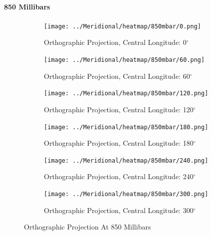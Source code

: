 \documentclass[hidelinks]{article}
\begin{document}
\paragraph{850 Millibars}
\begin{figure}[h!]
	\centering
	\begin{subfigure}[b]{0.45545\linewidth}
		\texttt{[image: ../Meridional/heatmap/850mbar/0.png]}
		\caption{Orthographic Projection, Central Longitude: 0$^\circ$}
	\end{subfigure}
	\begin{subfigure}[b]{0.45545\linewidth}
		\texttt{[image: ../Meridional/heatmap/850mbar/60.png]}
		\caption{Orthographic Projection, Central Longitude: 60$^\circ$}
	\end{subfigure}
	\begin{subfigure}[b]{0.45545\linewidth}
		\texttt{[image: ../Meridional/heatmap/850mbar/120.png]}
		\caption{Orthographic Projection, Central Longitude: 120$^\circ$}
	\end{subfigure}
	\begin{subfigure}[b]{0.45545\linewidth}
		\texttt{[image: ../Meridional/heatmap/850mbar/180.png]}
		\caption{Orthographic Projection, Central Longitude: 180$^\circ$}
	\end{subfigure}
	\begin{subfigure}[b]{0.45545\linewidth}
		\texttt{[image: ../Meridional/heatmap/850mbar/240.png]}
		\caption{Orthographic Projection, Central Longitude: 240$^\circ$}
	\end{subfigure}
	\begin{subfigure}[b]{0.45545\linewidth}
		\texttt{[image: ../Meridional/heatmap/850mbar/300.png]}
		\caption{Orthographic Projection, Central Longitude: 300$^\circ$}
	\end{subfigure}
	\caption{Orthographic Projection At 850 Millibars}
\end{figure}
\newpage
\end{document}
